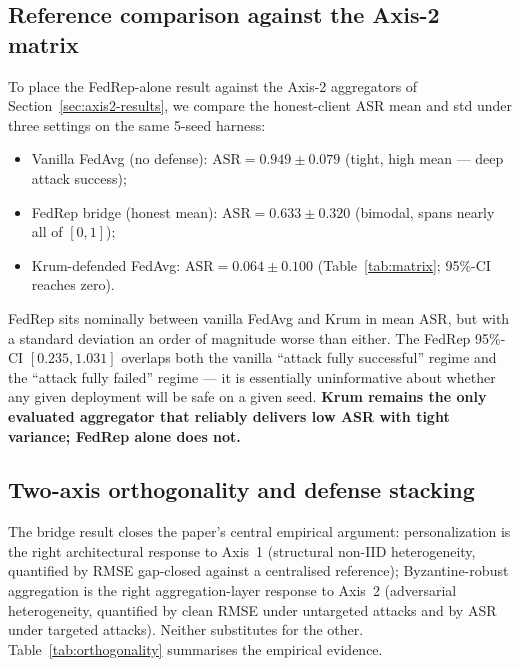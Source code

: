 \documentclass[a4paper,fleqn,doubleblind]{cas-sc}
\begin{document}
\subsection{Reference comparison against the Axis-2 matrix}
\label{sec:bridge-comparison}

To place the FedRep-alone result against the Axis-2 aggregators of
Section~\ref{sec:axis2-results}, we compare the honest-client ASR
mean and std under three settings on the same 5-seed harness:

\begin{itemize}
    \item Vanilla FedAvg (no defense): $\mathrm{ASR} = 0.949 \pm 0.079$ (tight, high mean --- deep attack success);
    \item FedRep bridge (honest mean): $\mathrm{ASR} = 0.633 \pm 0.320$ (bimodal, spans nearly all of $[0, 1]$);
    \item Krum-defended FedAvg: $\mathrm{ASR} = 0.064 \pm 0.100$ (Table~\ref{tab:matrix}; 95\%-CI reaches zero).
\end{itemize}

FedRep sits nominally between vanilla FedAvg and Krum in mean ASR,
but with a standard deviation an order of magnitude worse than
either. The FedRep 95\%-CI $[0.235, 1.031]$ overlaps both the
vanilla ``attack fully successful'' regime and the ``attack fully
failed'' regime --- it is essentially uninformative about whether
any given deployment will be safe on a given seed. \textbf{Krum
remains the only evaluated aggregator that reliably delivers low
ASR with tight variance; FedRep alone does not.}

\subsection{Two-axis orthogonality and defense stacking}
\label{sec:bridge-stacking}

The bridge result closes the paper's central empirical argument:
personalization is the right architectural response to Axis~1
(structural non-IID heterogeneity, quantified by RMSE gap-closed
against a centralised reference); Byzantine-robust aggregation is
the right aggregation-layer response to Axis~2 (adversarial
heterogeneity, quantified by clean RMSE under untargeted attacks
and by ASR under targeted attacks). Neither substitutes for the
other. Table~\ref{tab:orthogonality} summarises the empirical
evidence.
\end{document}
